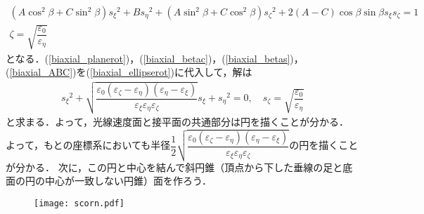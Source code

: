 \begin{align}
  \left(A\cos^2\beta+C\sin^2\beta\right){s_\xi}^2+B{s_\eta}^2+\left(A\sin^2\beta+C\cos^2\beta\right){s_\zeta}^2+2(A-C)\cos\beta\sin\beta{}s_\xi{}s_\zeta =1\label{biaxial_ellipserot} \\
  \zeta =\sqrt{\dfrac{\varepsilon_0}{\varepsilon_\eta}}\label{biaxial_planerot}
\end{align}
となる．(\ref{biaxial_planerot})，(\ref{biaxial_betac})，(\ref{biaxial_betas})，(\ref{biaxial_ABC})を(\ref{biaxial_ellipserot})に代入して，解は
\begin{align}
  {s_\xi}^2+\sqrt{\dfrac{\varepsilon_0(\varepsilon_\zeta-\varepsilon_\eta)(\varepsilon_\eta-\varepsilon_\xi)}{\varepsilon_\xi\varepsilon_\eta\varepsilon_\zeta}}s_\xi+{s_\eta}^2=0 , \quad
  s_\zeta=\sqrt{\dfrac{\varepsilon_0}{\varepsilon_\eta}}
\end{align}
と求まる．よって，光線速度面と接平面の共通部分は円を描くことが分かる．
よって，もとの座標系においても半径$\dfrac{1}{2}\sqrt{\dfrac{\varepsilon_0(\varepsilon_\zeta-\varepsilon_\eta)(\varepsilon_\eta-\varepsilon_\xi)}{\varepsilon_\xi\varepsilon_\eta\varepsilon_\zeta}}$の円を描くことが分かる．
次に，この円と中心を結んで斜円錐（頂点から下した垂線の足と底面の円の中心が一致しない円錐）面を作ろう．

\begin{figure}[ht]
  \centering
  \texttt{[image: scorn.pdf]}
  \caption{}
  \label{scorn}
\end{figure}

